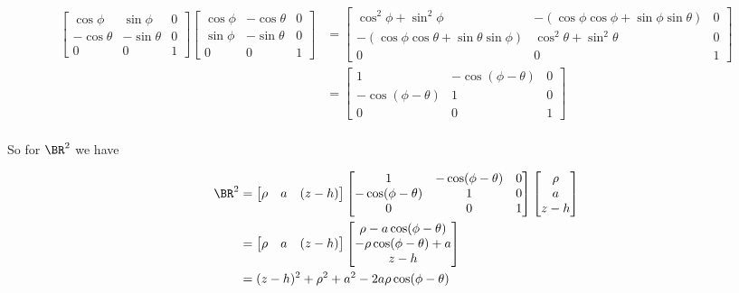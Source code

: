 \begin{align*}
\begin{bmatrix}
\cos\phi & \sin\phi & 0 \\
-\cos\theta & - \sin\theta & 0 \\
0 & 0 & 1 
\end{bmatrix}
\begin{bmatrix}
\cos\phi & - \cos\theta & 0 \\
\sin\phi & - \sin\theta & 0 \\
0 & 0 & 1 
\end{bmatrix}
&=
\begin{bmatrix}
\cos^2\phi + \sin^2\phi & -(\cos\phi \cos\phi + \sin\phi \sin\theta) & 0 \\
-(\cos\phi \cos\theta + \sin\theta \sin\phi) & \cos^2\theta + \sin^2\theta & 0 \\
0 & 0 & 1 
\end{bmatrix} \\
&=
\begin{bmatrix}
1 & - \cos(\phi - \theta) & 0 \\
- \cos(\phi - \theta) & 1  & 0 \\
0 & 0 & 1
\end{bmatrix} \\
\end{align*}

So for $\BR^2$ we have

\begin{align*}
\BR^2
&=
\begin{bmatrix}
\rho & a & (z -h) 
\end{bmatrix}
\begin{bmatrix}
1 & - \cos(\phi - \theta) & 0 \\
- \cos(\phi - \theta) & 1  & 0 \\
0 & 0 & 1
\end{bmatrix} 
\begin{bmatrix}
\rho \\
a \\
z - h
\end{bmatrix} \\
&=
\begin{bmatrix}
\rho & a & (z -h) 
\end{bmatrix}
\begin{bmatrix}
\rho - a \cos(\phi - \theta) \\
-\rho \cos(\phi - \theta) + a \\
z - h
\end{bmatrix} \\
&= 
(z - h)^2 + \rho^2 + a^2 - 2 a \rho \cos(\phi - \theta)
\end{align*}

